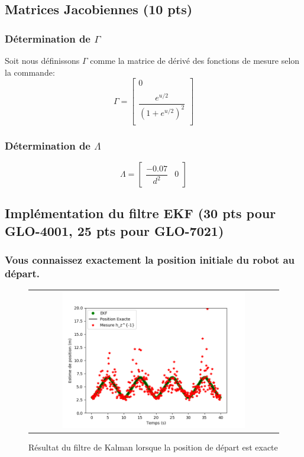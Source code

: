 \documentclass[12pt]{article}
\begin{document}
\subsection{Matrices Jacobiennes (10 pts)}

\subsubsection{Détermination de $\Gamma$}
Soit nous définissons $\Gamma$ comme la matrice de dérivé des fonctions de mesure selon la commande:
\begin{equation}
\Gamma =
\begin{bmatrix}
    0   \\
    \\
    \dfrac{e^{u/2}}{(1+e^{u/2})^2} \\
\end{bmatrix}
\end{equation}

\subsubsection{Détermination de $\Lambda$}
\begin{equation}
\Lambda =
\begin{bmatrix}
    \dfrac{-0.07}{d^2} & 0
\end{bmatrix}
\end{equation}

\subsection{Implémentation du filtre EKF (30 pts pour GLO-4001, 25 pts pour GLO-7021)}
\subsubsection{Vous connaissez exactement la position initiale du robot au départ.}

\begin{figure}[ht]
 \begin{center}
  \begin{tabular}{c}
    \includegraphics[width=0.75\textwidth]{fig/kalman-position-exacte.png}
  \end{tabular}
 \end{center}
\vspace{-0.25in}
 \caption{Résultat du filtre de Kalman lorsque la position de départ est exacte}
    \label{kalman-position-exacte}
\end{figure}
\end{document}
